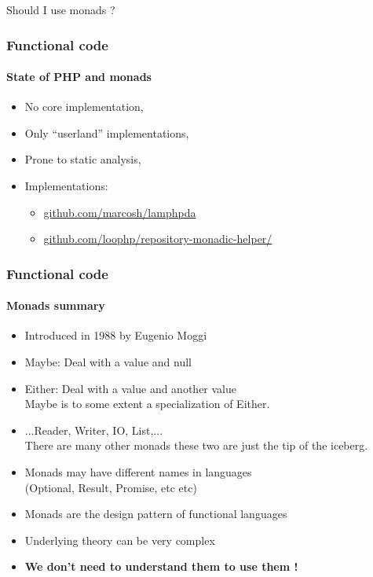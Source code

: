\begin{frame}
  \centering
  \Huge Should I use monads ?

\end{frame}

\begin{frame}
  \frametitle{Functional code}
  \framesubtitle{State of PHP and monads}

  \begin{itemize}[<+->]
    \item No core implementation,
    \item Only ``userland'' implementations,
    \item Prone to static analysis,
    \item Implementations:
          \begin{itemize}[<+->]
            \item \href{https://github.com/marcosh/lamphpda}{github.com/marcosh/lamphpda}
            \item \href{https://github.com/loophp/repository-monadic-helper/}{github.com/loophp/repository-monadic-helper/}
          \end{itemize}
  \end{itemize}
\end{frame}

\begin{frame}
  \frametitle{Functional code}
  \framesubtitle{Monads summary}

  \begin{itemize}[<+->]
    \item Introduced in 1988 by Eugenio Moggi
    \item Maybe: Deal with a value and null
    \item Either: Deal with a value and another value
          \\\textcolor{ecgrey!50}{Maybe is to some extent a specialization of Either.}
    \item ...Reader, Writer, IO, List,...
          \\\textcolor{ecgrey!50}{There are many other monads these
          two are just the tip of the iceberg.}
    \item Monads may have different names in languages
          \\\textcolor{ecgrey!50}{(Optional, Result, Promise, etc etc)}
    \item Monads are the design pattern of functional languages
    \item Underlying theory can be very complex
    \item \textbf{We don't need to understand them to use them !}
  \end{itemize}
\end{frame}

